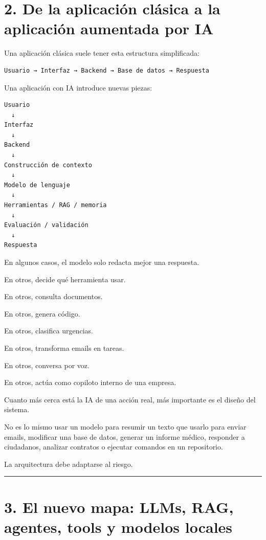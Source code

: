 \section{2. De la aplicación clásica a la aplicación aumentada por
IA}\label{de-la-aplicaciuxf3n-cluxe1sica-a-la-aplicaciuxf3n-aumentada-por-ia}

Una aplicación clásica suele tener esta estructura simplificada:

\begin{lstlisting}
Usuario → Interfaz → Backend → Base de datos → Respuesta
\end{lstlisting}

Una aplicación con IA introduce nuevas piezas:

\begin{lstlisting}
Usuario
  ↓
Interfaz
  ↓
Backend
  ↓
Construcción de contexto
  ↓
Modelo de lenguaje
  ↓
Herramientas / RAG / memoria
  ↓
Evaluación / validación
  ↓
Respuesta
\end{lstlisting}

En algunos casos, el modelo solo redacta mejor una respuesta.

En otros, decide qué herramienta usar.

En otros, consulta documentos.

En otros, genera código.

En otros, clasifica urgencias.

En otros, transforma emails en tareas.

En otros, conversa por voz.

En otros, actúa como copiloto interno de una empresa.

Cuanto más cerca está la IA de una acción real, más importante es el
diseño del sistema.

No es lo mismo usar un modelo para resumir un texto que usarlo para
enviar emails, modificar una base de datos, generar un informe médico,
responder a ciudadanos, analizar contratos o ejecutar comandos en un
repositorio.

La arquitectura debe adaptarse al riesgo.

\begin{center}\rule{0.5\linewidth}{0.5pt}\end{center}

\section{3. El nuevo mapa: LLMs, RAG, agentes, tools y modelos
locales}\label{el-nuevo-mapa-llms-rag-agentes-tools-y-modelos-locales}

